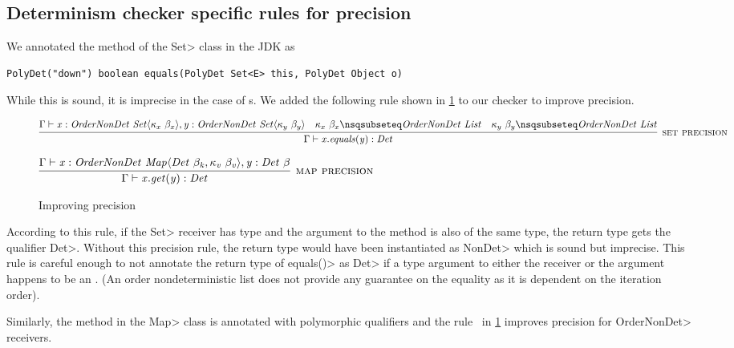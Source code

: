\subsection{Determinism checker specific rules for precision}\label{precision}
We annotated the  method of the \<Set> class in the JDK as
\begin{verbatim}
PolyDet("down") boolean equals(PolyDet Set<E> this, PolyDet Object o)
\end{verbatim}
While this is sound, it is imprecise in the case of s.
 We added the following rule shown in \cref{fig-precision-rules} to our checker to improve precision.
\begin{figure}
    $\infer[\rulename{set precision}]{\Gamma \vdash \|x.equals(y) : Det|}{\Gamma \vdash \|x| : \|OrderNonDet| \ \|Set|\angles{ \kappa_{x} \ \beta_{x}}, \|y| : \|OrderNonDet| \ \|Set|\angles{ \kappa_{y} \ \beta_{y}} & \kappa_{x} \ \beta_{x} \nsqsubseteq \|OrderNonDet \ List| & \kappa_{y} \ \beta_{y} \nsqsubseteq \|OrderNonDet \ List| }$
    
    \bigskip
    
    $\infer[\rulename{map precision}]{\Gamma \vdash \|x.get(y) : Det|}{\Gamma \vdash \|x : OrderNonDet \ Map\angles{ Det \ \beta_k, \kappa_v\ \beta_v }, y : Det \ \beta|}$
    
    \caption{Improving precision}
    \label{fig-precision-rules}
\end{figure}
According to this rule, if the \<Set> receiver has type  and the argument to the  method is
also of the same type, the return type gets the qualifier \<Det>. Without this precision rule, the return type would have been instantiated as \<NonDet> which
is sound but imprecise. This rule is careful enough to not annotate the return type of \<equals()> as \<Det> if a type argument to either the
receiver or the argument happens to be an .
(An order nondeterministic list does not provide any guarantee on the
equality as it is dependent on the iteration order). 

Similarly, the  method in the \<Map> class is annotated with polymorphic qualifiers and the rule \ in \cref{fig-precision-rules} improves precision for \<OrderNonDet> receivers.

